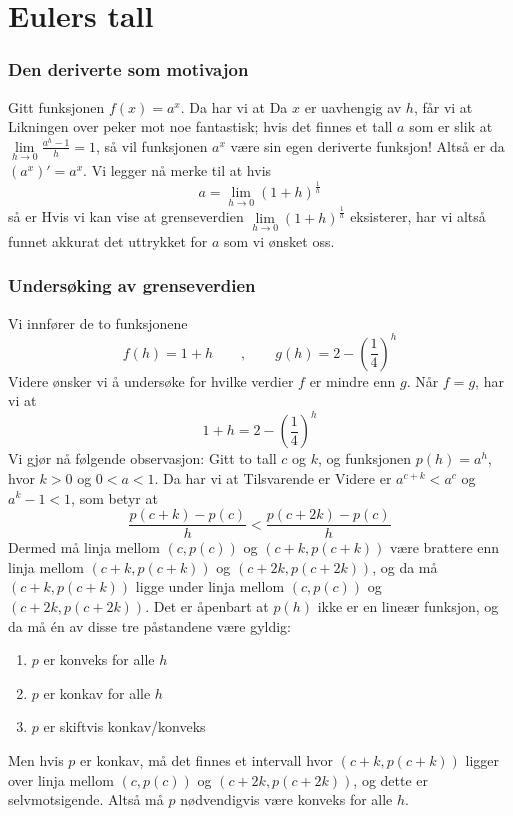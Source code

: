 



	
\section{Eulers tall}
\subsubsection{Den deriverte som motivajon}
Gitt funksjonen $ f(x)=a^x $. Da har vi at
Da $ x $ er uavhengig av $ h $, får vi at
Likningen over peker mot noe fantastisk; hvis det finnes et tall $ a $ som er slik at $ {\lim\limits_{h\to 0}\frac{a^h-1}{h}=1} $, så vil funksjonen $ a^x $ være sin egen deriverte funksjon! Altså er da $ \left(a^x\right)'=a^x $. Vi legger nå merke til at hvis
\[ a=\lim\limits_{h\to 0}\left(1+h\right)^\frac{1}{h} \]
så er 
Hvis vi kan vise at grenseverdien $ \lim\limits_{h\to 0}\left(1+h\right)^\frac{1}{h} $ eksisterer, har vi altså funnet akkurat det uttrykket for $ a $ som vi ønsket oss.

\subsubsection{Undersøking av grenseverdien}
Vi innfører de to funksjonene
\[ f(h)=1+h \qquad,\qquad g(h)=2-\left(\frac{1}{4}\right)^{h}\]
Videre ønsker vi å undersøke for hvilke verdier $ f $ er mindre enn  $ g $. Når $ f=g $, har vi at
\begin{equation}\label{eforkleqh}
	1+h=2-\left(\frac{1}{4}\right)^h 
\end{equation}
Vi gjør nå følgende observasjon: Gitt to tall $ c $ og $ k $, og funksjonen $ p(h)=a^h $, hvor $ k>0 $ og $ 0<a<1 $. Da har vi at
Tilsvarende er
Videre er $ a^{c+k}<a^c $ og $ a^k-1<1 $, som betyr at
\[ \frac{p(c+k)-p(c)}{h}<\frac{p(c+2k)-p(c)}{h} \]
Dermed må linja mellom $ (c, p(c)) $ og $ (c+k, p(c+k)) $ være brattere enn linja mellom $ (c+k, p(c+k)) $ og $ (c+2k, p(c+2k)) $, og da må $ (c+k, p(c+k)) $ ligge under linja mellom $ (c, p(c)) $ og $ (c+2k, p(c+2k)) $.
Det er åpenbart at $ p(h) $ ikke er en lineær funksjon, og da må én av disse tre påstandene være gyldig:
\begin{enumerate}[label=(\alph*)]
	\item $ p $ er konveks for alle $ h$
	\item $ p $ er konkav for alle $ h $
	\item $ p $ er skiftvis konkav/konveks
\end{enumerate}
Men hvis $ p $ er konkav, må det finnes et intervall hvor $ (c+k, p(c+k)) $ ligger over linja mellom $ (c, p(c)) $ og $ (c+2k, p(c+2k)) $, og dette er selvmotsigende. Altså må $ p $ nødvendigvis være konveks for alle $ h $.\vsk

